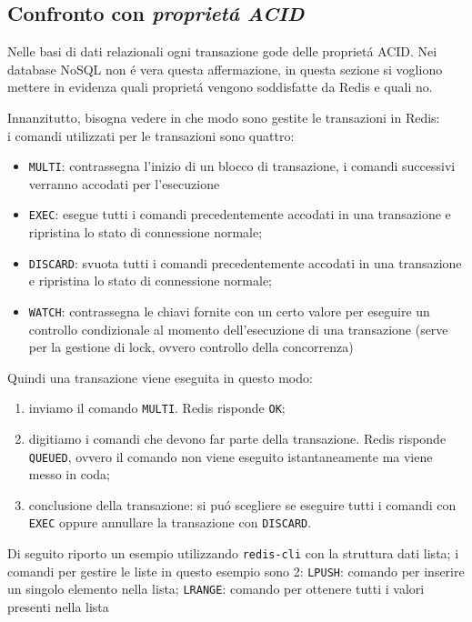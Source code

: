 \subsection{Confronto con \emph{proprietá ACID}}
Nelle basi di dati relazionali ogni transazione gode delle proprietá ACID. Nei database NoSQL non é vera questa affermazione, in questa
sezione si vogliono mettere in evidenza quali proprietá vengono soddisfatte da Redis e quali no.

Innanzitutto, bisogna vedere in che modo sono gestite le transazioni in Redis:\\
i comandi utilizzati per le transazioni sono quattro:
\begin{itemize}
    \item \texttt{MULTI}: contrassegna l'inizio di un blocco di transazione, i comandi successivi verranno accodati per l'esecuzione
    \item \texttt{EXEC}: esegue tutti i comandi precedentemente accodati in una transazione e ripristina lo stato di connessione normale;
    \item \texttt{DISCARD}: svuota tutti i comandi precedentemente accodati in una transazione e ripristina lo stato di connessione normale;
    \item \texttt{WATCH}: contrassegna le chiavi fornite con un certo valore per eseguire un controllo condizionale al momento dell'esecuzione
    di una transazione (serve per la gestione di lock, ovvero controllo della concorrenza)
\end{itemize}

Quindi una transazione viene eseguita in questo modo:
\begin{enumerate}
    \item inviamo il comando \texttt{MULTI}. Redis risponde \texttt{OK};
    \item digitiamo i comandi che devono far parte della transazione. Redis risponde \texttt{QUEUED}, ovvero il comando non viene eseguito
    istantaneamente ma viene messo in coda;
    \item conclusione della transazione: si puó scegliere se eseguire tutti i comandi con \texttt{EXEC} oppure annullare la transazione
    con \texttt{DISCARD}.
\end{enumerate}

Di seguito riporto un esempio utilizzando \texttt{redis-cli} con la struttura dati lista; i comandi per gestire le liste in questo esempio
sono 2: \texttt{LPUSH}: comando per inserire un singolo elemento nella lista; \texttt{LRANGE}: comando per ottenere tutti i valori presenti nella lista

